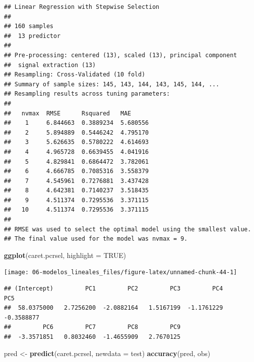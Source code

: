 \documentclass[
]{book}
\newenvironment{Shaded}{\begin{snugshade}}{\end{snugshade}}
\newcommand{\DataTypeTok}[1]{\textcolor[rgb]{0.13,0.29,0.53}{#1}}
\newcommand{\KeywordTok}[1]{\textcolor[rgb]{0.13,0.29,0.53}{\textbf{#1}}}
\newcommand{\NormalTok}[1]{#1}
\newcommand{\OperatorTok}[1]{\textcolor[rgb]{0.81,0.36,0.00}{\textbf{#1}}}
\newcommand{\OtherTok}[1]{\textcolor[rgb]{0.56,0.35,0.01}{#1}}
\newcommand{\StringTok}[1]{\textcolor[rgb]{0.31,0.60,0.02}{#1}}
\theoremstyle{break}
\theoremstyle{definition}
\theoremstyle{definition}
\theoremstyle{definition}
\theoremstyle{remark}
\begin{document}
\begin{verbatim}
## Linear Regression with Stepwise Selection 
## 
## 160 samples
##  13 predictor
## 
## Pre-processing: centered (13), scaled (13), principal component
##  signal extraction (13) 
## Resampling: Cross-Validated (10 fold) 
## Summary of sample sizes: 145, 143, 144, 143, 145, 144, ... 
## Resampling results across tuning parameters:
## 
##   nvmax  RMSE      Rsquared   MAE     
##    1     6.844663  0.3889234  5.680556
##    2     5.894889  0.5446242  4.795170
##    3     5.626635  0.5780222  4.614693
##    4     4.965728  0.6639455  4.041916
##    5     4.829841  0.6864472  3.782061
##    6     4.666785  0.7085316  3.558379
##    7     4.545961  0.7276881  3.437428
##    8     4.642381  0.7140237  3.518435
##    9     4.511374  0.7295536  3.371115
##   10     4.511374  0.7295536  3.371115
## 
## RMSE was used to select the optimal model using the smallest value.
## The final value used for the model was nvmax = 9.
\end{verbatim}

\begin{Shaded}
\begin{Highlighting}[]
\KeywordTok{ggplot}\NormalTok{(caret.pcrsel, }\DataTypeTok{highlight =} \OtherTok{TRUE}\NormalTok{)}
\end{Highlighting}
\end{Shaded}

\begin{center}\texttt{[image: 06-modelos\_lineales\_files/figure-latex/unnamed-chunk-44-1]} \end{center}

\begin{Shaded}
\end{Shaded}

\begin{verbatim}
## (Intercept)         PC1         PC2         PC3         PC4         PC5 
##  58.0375000   2.7256200  -2.0882164   1.5167199  -1.1761229  -0.3588877 
##         PC6         PC7         PC8         PC9 
##  -3.3571851   0.8032460  -1.4655909   2.7670125
\end{verbatim}

\begin{Shaded}
\begin{Highlighting}[]
\NormalTok{pred <-}\StringTok{ }\KeywordTok{predict}\NormalTok{(caret.pcrsel, }\DataTypeTok{newdata =}\NormalTok{ test)}
\KeywordTok{accuracy}\NormalTok{(pred, obs)}
\end{Highlighting}
\end{Shaded}
\end{document}
